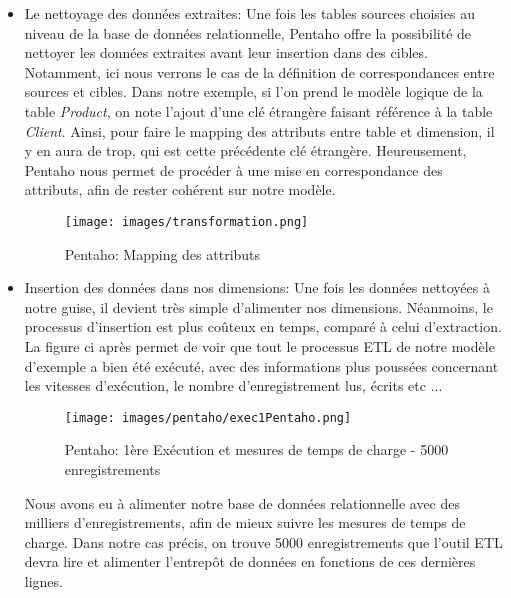 \documentclass[12pt,a4wide,twoside]{report}
\begin{document}
\begin{itemize}
	\item Le nettoyage des données extraites: \newline 
	Une fois les tables sources choisies au niveau de la base de données relationnelle, Pentaho offre la possibilité de nettoyer les données extraites avant leur insertion dans des cibles. Notamment, ici nous verrons le cas de la définition de correspondances entre sources et cibles.\newline
	Dans notre exemple, si l'on prend le modèle logique de la table \emph{Product}, on note l'ajout d'une clé étrangère faisant référence à la table \emph{Client}. Ainsi, pour faire le mapping des attributs entre table et dimension, il y en aura de trop, qui est cette précédente clé étrangère.\newline
	Heureusement, Pentaho nous permet de procéder à une mise en correspondance des attributs, afin de rester cohérent sur notre modèle.
	\begin{figure}[!h]
	\begin{center}
		\texttt{[image: images/transformation.png]}
	\end{center}
		\caption{Pentaho: Mapping des attributs}
	\end{figure}
	\newline
	\item Insertion des données dans nos dimensions:\newline
	Une fois les données nettoyées à notre guise, il devient très simple d'alimenter nos dimensions. Néanmoins, le processus d'insertion est plus coûteux en temps, comparé à celui d'extraction. \newline 
	La figure ci après permet de voir que tout le processus ETL de notre modèle d'exemple a bien été exécuté, avec des informations plus poussées concernant les vitesses d'exécution, le nombre d'enregistrement lus, écrits etc ... \newline
		\begin{figure}[!h]
		\texttt{[image: images/pentaho/exec1Pentaho.png]}
		\caption{Pentaho: 1ère Exécution et mesures de temps de charge - 5000 enregistrements}
	\end{figure}
	\newline
	Nous avons eu à alimenter notre base de données relationnelle avec des milliers d'enregistrements, afin de mieux suivre les mesures de temps de charge. Dans notre cas précis, on trouve 5000 enregistrements que l'outil ETL devra lire et alimenter l'entrepôt de données en fonctions de ces dernières lignes.\newline

\end{itemize}
\end{document}
